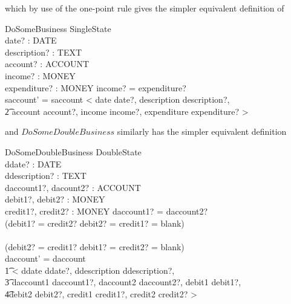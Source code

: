 \documentclass[11pt]{amsart}
\begin{document}
which by use of the one-point rule gives the simpler equivalent definition of

\begin{schema}{DoSomeBusiness}
\Delta SingleState\\
date? : DATE\\
description? : TEXT\\
account? : ACCOUNT\\ 
income? : MONEY\\
expenditure? : MONEY
\where
income? = expenditure? \\
saccount' = saccount \cat < \lbind date \mapsto date?, description \mapsto description?, \\
\t2 account \mapsto account?, income \mapsto income?, expenditure \mapsto expenditure?  \rbind >\\
\end{schema}

\indent and $DoSomeDoubleBusiness$ similarly has the simpler equivalent definition

\begin{schema}{DoSomeDoubleBusiness}
\Delta DoubleState\\
ddate? : DATE\\
ddescription? : TEXT\\
daccount1?, dacount2? : ACCOUNT\\ 
debit1?, debit2? : MONEY\\
credit1?, credit2? : MONEY
\where
daccount1? = daccount2? \land \\
(debit1? = credit2? \land debit2? = credit1? = blank)\\
\lor\\
(debit2? = credit1? \land debit1? = credit2? = blank)\\
daccount' = daccount \cat \\
\t1 < \lbind ddate \mapsto ddate?, ddescription \mapsto ddescription?, \\
\t3 daccount1 \mapsto daccount1?, daccount2 \mapsto daccount2?, debit1 \mapsto debit1?, \\
\t 4debit2 \mapsto debit2?, credit1 \mapsto credit1?, credit2 \mapsto credit2?  \rbind >\\
\end{schema}
\end{document}
